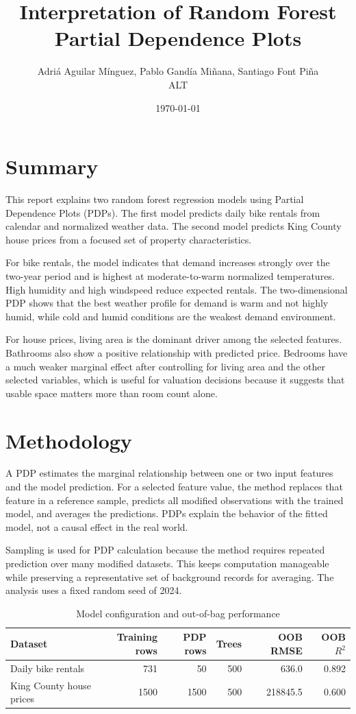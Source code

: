 \documentclass[11pt]{article}
\title{Interpretation of Random Forest Partial Dependence Plots}
\author{
    Adriá Aguilar Mínguez, Pablo Gandía Miñana, Santiago Font Piña \\
    \small  ALT
}
\date{\today}
\begin{document}
\maketitle

\section{Summary}

This report explains two random forest regression models using Partial Dependence Plots (PDPs). The first model predicts daily bike rentals from calendar and normalized weather data. The second model predicts King County house prices from a focused set of property characteristics.

For bike rentals, the model indicates that demand increases strongly over the two-year period and is highest at moderate-to-warm normalized temperatures. High humidity and high windspeed reduce expected rentals. The two-dimensional PDP shows that the best weather profile for demand is warm and not highly humid, while cold and humid conditions are the weakest demand environment.

For house prices, living area is the dominant driver among the selected features. Bathrooms also show a positive relationship with predicted price. Bedrooms have a much weaker marginal effect after controlling for living area and the other selected variables, which is useful for valuation decisions because it suggests that usable space matters more than room count alone.

\section{Methodology}

A PDP estimates the marginal relationship between one or two input features and the model prediction. For a selected feature value, the method replaces that feature in a reference sample, predicts all modified observations with the trained model, and averages the predictions. PDPs explain the behavior of the fitted model, not a causal effect in the real world.

Sampling is used for PDP calculation because the method requires repeated prediction over many modified datasets. This keeps computation manageable while preserving a representative set of background records for averaging. The analysis uses a fixed random seed of 2024.

\begin{table}[H]
\centering
\caption{Model configuration and out-of-bag performance}
\begin{tabular}{lrrrrr}
\toprule
Dataset & Training rows & PDP rows & Trees & OOB RMSE & OOB $R^2$ \\
\midrule
Daily bike rentals & 731 & 50 & 500 & 636.0 & 0.892 \\
King County house prices & 1500 & 1500 & 500 & 218845.5 & 0.600 \\
\bottomrule
\end{tabular}
\end{table}
\end{document}
